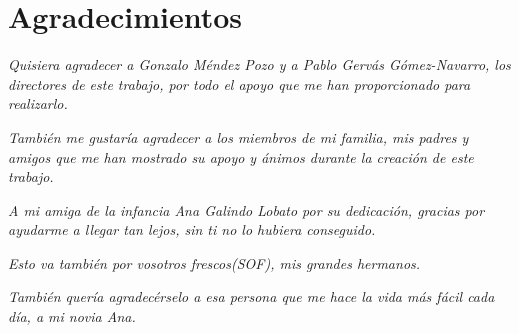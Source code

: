 %
%


\chapter*{Agradecimientos}


\textit{Quisiera agradecer a Gonzalo Méndez Pozo y a Pablo Gervás Gómez-Navarro, los directores de este trabajo, por todo el apoyo que me han proporcionado para realizarlo.}

\textit{También me gustaría agradecer a los miembros de mi familia, mis padres y amigos que me han mostrado su apoyo y ánimos durante la creación de este trabajo.}

\textit{A mi amiga de la infancia Ana Galindo Lobato por su dedicación, gracias por ayudarme a llegar tan lejos, sin ti no lo hubiera conseguido.}

\textit{Esto va también por vosotros frescos(SOF), mis grandes hermanos.}

\textit{También quería agradecérselo a esa persona que me hace la vida más fácil cada día, a mi novia Ana.}


